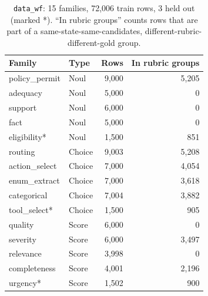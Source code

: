 \begin{table}[h]
  \centering
  \caption{\texttt{data\_wf}: 15 families, 72{,}006 train rows, 3 held out (marked *). ``In rubric groups''
  counts rows that are part of a same-state-same-candidates, different-rubric-different-gold group.}
  \label{tab:app-wf}
  \small
  \begin{tabular}{llrr}
    \toprule
    Family & Type & Rows & In rubric groups \\
    \midrule
    policy\_permit & Noul & 9{,}000 & 5{,}205 \\
    adequacy & Noul & 5{,}000 & 0 \\
    support & Noul & 6{,}000 & 0 \\
    fact & Noul & 5{,}000 & 0 \\
    eligibility* & Noul & 1{,}500 & 851 \\
    routing & Choice & 9{,}003 & 5{,}208 \\
    action\_select & Choice & 7{,}000 & 4{,}054 \\
    enum\_extract & Choice & 7{,}000 & 3{,}618 \\
    categorical & Choice & 7{,}004 & 3{,}882 \\
    tool\_select* & Choice & 1{,}500 & 905 \\
    quality & Score & 6{,}000 & 0 \\
    severity & Score & 6{,}000 & 3{,}497 \\
    relevance & Score & 3{,}998 & 0 \\
    completeness & Score & 4{,}001 & 2{,}196 \\
    urgency* & Score & 1{,}502 & 900 \\
    \bottomrule
  \end{tabular}
\end{table}

